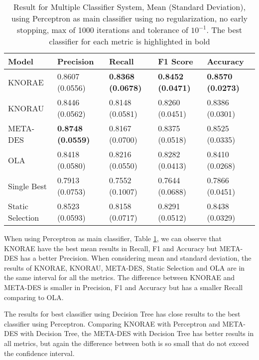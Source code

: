 \begin{table}[!t]
    \centering
    \renewcommand{\arraystretch}{1.8}
    \begin{tabular}{ p{3cm}p{2.8cm}p{2.8cm}p{2.8cm}p{2.8cm} }
        \toprule
        Model & Precision & Recall & F1 Score & Accuracy \\
        \midrule
        KNORAE &            0.8607 (0.0556) & \textbf{0.8368 (0.0678)} & \textbf{0.8452 (0.0471)} & \textbf{0.8570 (0.0273)} \\
        KNORAU &            0.8446 (0.0562) & 0.8148 (0.0581) & 0.8260 (0.0451) & 0.8386 (0.0301) \\
        META-DES &          \textbf{0.8748 (0.0559)} & 0.8167 (0.0700) & 0.8375 (0.0518) & 0.8525 (0.0335) \\
        OLA &               0.8418 (0.0580) & 0.8216 (0.0550) & 0.8282 (0.0413) & 0.8410 (0.0268) \\
        Single Best &       0.7913 (0.0753) & 0.7552 (0.1007) & 0.7644 (0.0688) & 0.7866 (0.0451) \\
        Static Selection &  0.8523 (0.0593) & 0.8158 (0.0717) & 0.8291 (0.0512) & 0.8438 (0.0329) \\ [1ex]
        \bottomrule
        \end{tabular}
        \caption{%
        Result for Multiple Classifier System, Mean (Standard Deviation), using Perceptron as main classifier using no regularization, no early stopping, max of 1000 iterations and tolerance of $10^{-1}$. The best classifier for each metric is highlighted in bold%
        }\label{mcs_perceptron_table}
        \vspace{4ex}
\end{table}

When using Perceptron as main classifier, Table \ref{mcs_perceptron_table}, we can observe that KNORAE have the best mean results in Recall, F1 and Accuracy but META-DES has a better Precision. When considering mean and standard deviation, the results of KNORAE, KNORAU, META-DES, Static Selection and OLA are in the same interval for all the metrics. The difference between KNORAE and META-DES is smaller in Precision, F1 and Accuracy but has a smaller Recall comparing to OLA. 

The results for best classifier using Decision Tree has close results to the best classifier using Perceptron. Comparing KNORAE with Perceptron and META-DES with Decision Tree, the META-DES with Decision Tree has better results in all metrics, but again the difference between both is so small that do not exceed the confidence interval.
